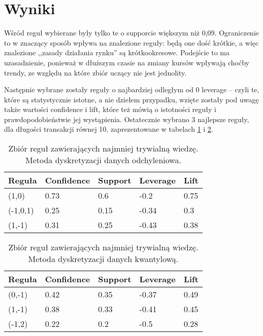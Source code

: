 \documentclass[a4paper,10pt]{article}
\begin{document}
\section{Wyniki}
Wśród reguł wybierane były tylko te o supporcie większym niż 0,09. Ograniczenie to w znaczący sposób wpływa na znalezione reguły: będą one dość krótkie, 
a więc znalezione ,,zasady działania rynku'' są krótkookresowe. Podejście to ma uzasadnienie, ponieważ w dłuższym czasie na zmiany kursów wpływają 
choćby trendy, ze względu na które zbiór uczący nie jest jednolity.

Następnie wybrane zostały reguły o najbardziej odległym od 0 leverage – czyli te, które są statystycznie istotne, a nie dziełem przypadku, 
wzięte zostały pod uwagę także wartości confidence i lift, które też mówią o istotności reguły i prawdopodobieństwie jej wystąpienia. 
Ostatecznie wybrano 3 najlepsze reguły, dla długości transakcji równej 10, zaprezentowane w tabelach \ref{tab:k1} i \ref{tab:k2}.

\begin{center}
\begin{table}
\centering
\caption{Zbiór reguł zawierających najmniej trywialną wiedzę. Metoda dyskretyzacji danych odchyleniowa.}
\begin{tabular}{|l|l|l|l|l|} 
\hline
\bf{Reguła} & \bf{Confidence} & \bf{Support} & \bf{Leverage} & \bf{Lift} \\ \hline
(1,0) & 0.73 & 0.6 & -0.2 & 0.75 \\ \hline
(-1,0,1) & 0.25 & 0.15 & -0.34 & 0.3 \\ \hline
(1,-1) & 0.31 & 0.25 & -0.43 & 0.38 \\ \hline
\end{tabular}
\label{tab:k1}
\end{table}
\end{center}


\begin{center}
\begin{table}
\centering
\caption{Zbiór reguł zawierających najmniej trywialną wiedzę. Metoda dyskretyzacji danych kwantylową.}
\begin{tabular}{|l|l|l|l|l|} 
\hline
\bf{Reguła} & \bf{Confidence} & \bf{Support} & \bf{Leverage} & \bf{Lift} \\ \hline
(0,-1) & 0.42 & 0.35 & -0.37 & 0.49  \\ \hline
(1,-1) & 0.38 & 0.33 & -0.41 & 0.45 \\ \hline
(-1,2) & 0.22 & 0.2 & -0.5 & 0.28 \\ \hline
\end{tabular}
\label{tab:k2}
\end{table}
\end{center}
\end{document}
